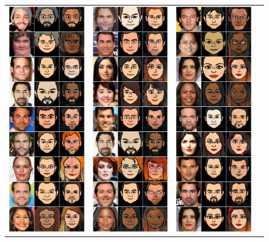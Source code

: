\documentclass{article} %
\begin{document}
\begin{figure}[t]
\centering
\begin{tabular}{cccc}
\includegraphics[trim=0 0 0 0, clip, width=0.2235\linewidth]{part1.jpg}&
\includegraphics[trim=0 0 0 0, clip, width=0.2235\linewidth]{part2.jpg}&
\includegraphics[trim=0 0 0 0, clip, width=0.2235\linewidth]{part3.jpg}&

\end{tabular}
\end{figure}
\end{document}
